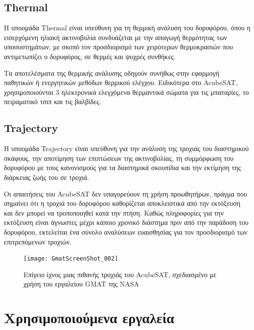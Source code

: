 \documentclass[a4paper,nobib]{tufte-book}
\begin{document}
\subsection{Thermal}


Η υποομάδα Thermal είναι υπεύθυνη για τη θερμική ανάλυση του δορυφόρου, όπου η εισερχόμενη ηλιακή ακτινοβολία συνδυάζεται με την απαγωγή θερμότητας των υποσυστημάτων, με σκοπό τον προσδιορισμό των χειρότερων θερμοκρασιών που αντιμετωπίζει ο δορυφόρος, σε θερμές και ψυχρές συνθήκες.

Τα αποτελέσματα της θερμικής ανάλυσης οδηγούν συνήθως στην εφαρμογή παθητικών ή ενεργητικών μεθόδων θερμικού ελέγχου. Ειδικότερα στο AcubeSAT, χρησιμοποιούνται 3 ηλεκτρονικά ελεγχόμενα θερμαντικά σώματα για τις μπαταρίες, το πειραματικό τσιπ και τις βαλβίδες.

\subsection{Trajectory}

Η υποομάδα Trajectory είναι υπεύθυνη για την ανάλυση της τροχιάς του διαστημικού σκάφους, την αποτίμηση των επιπτώσεων της ακτινοβολίας, τη συμμόρφωση του δορυφόρου με τους κανονισμούς για τα διαστημικά σκουπίδια και την εκτίμηση της διάρκειας ζωής του σε τροχιά.

Οι απαιτήσεις του AcubeSAT δεν υπαγορεύουν τη χρήση προωθητήρων, πράγμα που σημαίνει ότι η τροχιά του δορυφόρου καθορίζεται αποκλειστικά από την εκτόξευση και δεν μπορεί να τροποποιηθεί κατά την πτήση. Καθώς πληροφορίες για την εκτόξευση είναι άγνωστες μέχρι κάποιο χρονικό διάστημα πριν από την παράδοση του δορυφόρου, εκτελείται ένα σύνολο αναλύσεων ευαισθησίας για τον προσδιορισμό των επιτρεπόμενων τροχιών. \autocite{MDO,anthopoulos_orbital_analysis_2020}
\begin{figure}
	\texttt{[image: GmatScreenShot\_002]}
	\caption[Επίγειο ίχνος μιας πιθανής τροχιάς του AcubeSAT]{Επίγειο ίχνος μιας πιθανής τροχιάς του AcubeSAT, σχεδιασμένο με χρήση του εργαλείου \acl{GMAT} της NASA}
	\label{fig:gmat}
\end{figure}


\section{Χρησιμοποιούμενα εργαλεία}
\end{document}
